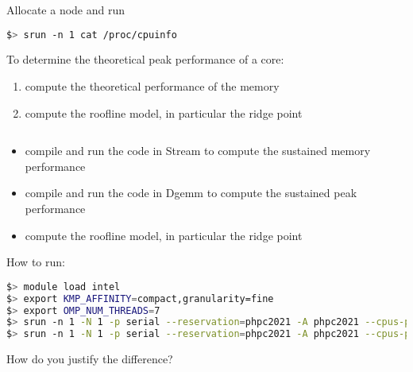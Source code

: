 \documentclass[11pt,a4paper]{article}
\begin{document}

\noindent

\begin{exercise}
  $~$ %

Allocate a node and run
\begin{lstlisting}[language=bash]
$> srun -n 1 cat /proc/cpuinfo
\end{lstlisting}

To determine the theoretical peak performance of a core:

\begin{enumerate}
\item compute the theoretical performance of the memory
\item compute the roofline model, in particular the ridge point
\end{enumerate}

\end{exercise}

\begin{exercise}
  $~$ %

\begin{itemize}
\item compile and run the code in Stream to compute the sustained memory performance
\item compile and run the code in Dgemm to compute the sustained peak performance 
\item compute the roofline model, in particular the ridge point
\end{itemize}

How to run:

\begin{lstlisting}[language=bash,basicstyle=\tiny]
$> module load intel
$> export KMP_AFFINITY=compact,granularity=fine
$> export OMP_NUM_THREADS=7
$> srun -n 1 -N 1 -p serial --reservation=phpc2021 -A phpc2021 --cpus-per-task $OMP_NUM_THREADS ./stream
$> srun -n 1 -N 1 -p serial --reservation=phpc2021 -A phpc2021 --cpus-per-task $OMP_NUM_THREADS ./dgemm
\end{lstlisting}

How do you justify the difference?

\end{exercise}
\end{document}

